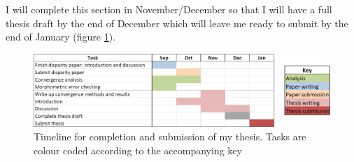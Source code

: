 \documentclass[12pt,a4paper]{article}
\begin{document}
	I will complete this section in November/December so that I will have a full thesis draft by the end of December which will leave me ready to submit by the end of January (figure \ref{gantt}).


	


	





\begin{landscape}
  \begin{figure}[p]
	\centering
	\includegraphics[keepaspectratio=true]{Gannt_July.png}
	\caption{Timeline for completion and submission of my thesis. Tasks are colour coded according to the accompanying key}
	\label{gantt}
  \end{figure}
\end{landscape}



 
\end{document}
